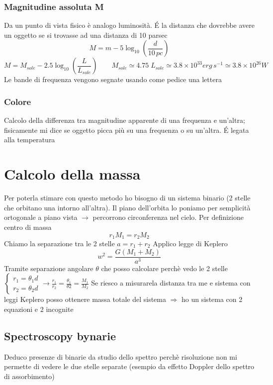 \subsubsection*{Magnitudine assoluta M}
Da un punto di vista fisico è analogo luminosità. \'E la distanza che dovrebbe avere un oggetto se si trovasse ad una distanza di 10 parsec
\begin{equation*}
    M = m - 5\log_{10} \left(\frac{d}{10 \, pc}\right)
\end{equation*}
\begin{equation*}
    M = M_{sole} - 2.5 \log_{10}\left(\frac{L}{L_{sole}}\right) \qquad M_{sole} \simeq 4.75 \; L_{sole} \simeq 3.8 \times 10^{33} erg \, s^{-1} \simeq 3.8 \times 10^{26} W
\end{equation*}
Le bande di frequenza vengono segnate usando come pedice una lettera

\subsubsection*{Colore}
Calcolo della differenza tra magnitudine apparente di una frequenza e un'altra; fisicamente mi dice se oggetto picca più su una frequenza o su un'altra. \'E legata alla temperatura

\section*{Calcolo della massa}
Per poterla stimare con questo metodo ho bisogno di un sistema binario (2 stelle che orbitano una intorno all'altra). Il piano dell'orbita lo poniamo per semplicità ortogonale a piano vista $\rightarrow$ percorrono circonferenza nel cielo. \newline
Per definizione centro di massa
\begin{equation*}
    r_1M_1 = r_2M_2
\end{equation*}
Chiamo la separazione tra le 2 stelle $a = r_1+r_2$ \newline
Applico legge di Keplero
\begin{equation*}
    w^2 = \frac{G(M_1+M_2)}{a^3}
\end{equation*}
Tramite separazione angolare $\theta$ che posso calcolare perchè vedo le 2 stelle 
$\begin{cases*}
    r_1 = \theta_1 d \\
    r_2 = \theta_2 d
\end{cases*} 
\rightarrow \frac{r_1}{r_2} = \frac{\theta_1}{\theta2}= \frac{M_1}{M_2}$ \newline
Se riesco a misurarela distanza tra me e sistema con leggi Keplero posso ottenere massa totale del sistema $\Rightarrow$ ho un sistema con 2 equazioni e 2 incognite

\subsection*{Spectroscopy bynarie}
Deduco presenze di binarie da studio dello spettro perchè risoluzione non mi permette di vedere le due stelle separate (esempio da effetto Doppler dello spettro di assorbimento)